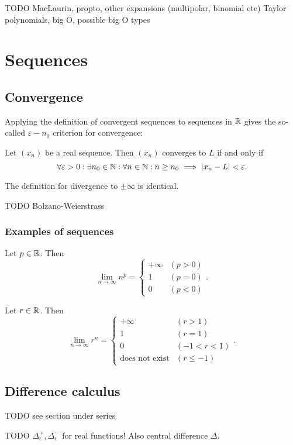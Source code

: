 TODO MacLaurin, propto, other expansions (multipolar, binomial etc) 
Taylor polynomials, big O, possible big O types

\section{Sequences}
\subsection{Convergence}
Applying the definition of convergent sequences to sequences in $\mathbb{R}$ gives the so-called $\varepsilon-n_0$ criterion for convergence:
\begin{proposition}
Let $(x_n)$ be a real sequence. Then $(x_n)$ converges to $L$ \textup{if and only if}
\[ \forall \varepsilon> 0: \exists n_0\in\mathbb{N}: \forall n\in\mathbb{N}: n\geq n_0 \implies |x_n-L|<\varepsilon. \]
\end{proposition}
The definition for divergence to $\pm\infty$ is identical.

TODO Bolzano-Weierstrass

\subsubsection{Examples of sequences}
\begin{proposition}
Let $p\in\mathbb{R}$. Then
\[ \lim_{n\to\infty} n^p = \begin{cases}
+\infty & (p>0) \\
1 & (p=0) \\
0 & (p<0)
\end{cases}. \]
\end{proposition}

\begin{proposition}
Let $r\in\mathbb{R}$. Then
\[ \lim_{n\to\infty} r^n = \begin{cases}
+\infty & (r>1) \\
1 & (r=1) \\
0 & (-1<r<1) \\
\text{does not exist} & (r\leq -1)
\end{cases}. \]
\end{proposition}

\subsection{Difference calculus}
TODO see section under series

TODO $\Delta^+_\epsilon, \Delta^-_\epsilon$ for real functions! Also central difference $\Delta$.
